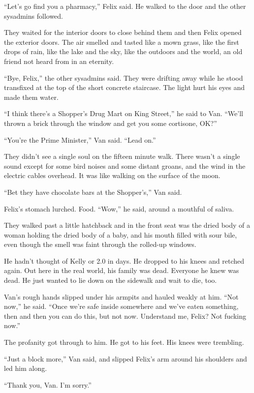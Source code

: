 “Let’s go find you a pharmacy,” Felix said. He walked to the door
and the other sysadmins followed.

They waited for the interior doors to close behind them and then
Felix opened the exterior doors. The air smelled and tasted like a
mown grass, like the first drops of rain, like the lake and the
sky, like the outdoors and the world, an old friend not heard from
in an eternity.

“Bye, Felix,” the other sysadmins said. They were drifting away
while he stood transfixed at the top of the short concrete
staircase. The light hurt his eyes and made them water.

“I think there’s a Shopper’s Drug Mart on King Street,” he said to
Van. “We’ll thrown a brick through the window and get you some
cortisone, OK?”

“You’re the Prime Minister,” Van said. “Lead on.”

\tb

They didn’t see a single soul on the fifteen minute walk. There
wasn’t a single sound except for some bird noises and some distant
groans, and the wind in the electric cables overhead. It was like
walking on the surface of the moon.

“Bet they have chocolate bars at the Shopper’s,” Van said.

Felix’s stomach lurched. Food. “Wow,” he said, around a mouthful of
saliva.

They walked past a little hatchback and in the front seat was the
dried body of a woman holding the dried body of a baby, and his
mouth filled with sour bile, even though the smell was faint
through the rolled-up windows.

He hadn’t thought of Kelly or 2.0 in days. He dropped to his knees
and retched again. Out here in the real world, his family was dead.
Everyone he knew was dead. He just wanted to lie down on the
sidewalk and wait to die, too.

Van’s rough hands slipped under his armpits and hauled weakly at
him. “Not now,” he said. “Once we’re safe inside somewhere and
we’ve eaten something, then and then you can do this, but not now.
Understand me, Felix? Not fucking now.”

The profanity got through to him. He got to his feet. His knees
were trembling.

“Just a block more,” Van said, and slipped Felix’s arm around his
shoulders and led him along.

“Thank you, Van. I’m sorry.”

